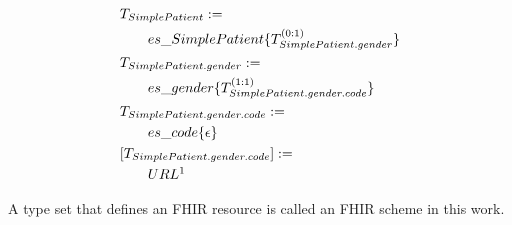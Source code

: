 \begin{align*}
&T_{SimplePatient}:= \\
&\qquad es\_SimplePatient\{T_{SimplePatient.gender}^{(0:1)}\} \\
&T_{SimplePatient.gender}:= \\
&\qquad es\_gender\{T_{SimplePatient.gender.code}^{(1:1)}\} \\
&T_{SimplePatient.gender.code}:= \\
&\qquad es\_code\{\epsilon\} \\
&[T_{SimplePatient.gender.code}] := \\
&\qquad URL \footnotemark[1] \\
\end{align*}

A type set that defines an FHIR resource is called an FHIR scheme in this work.
